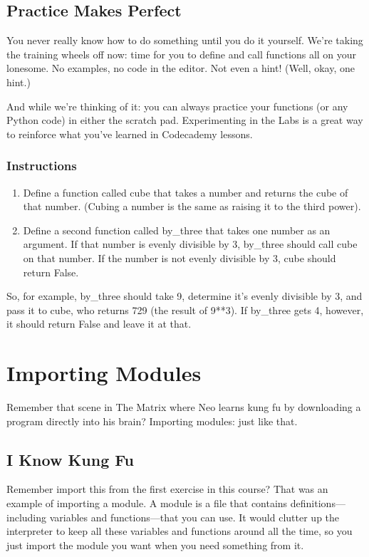 \documentclass[12pt,a4paper,final,twoside,onecolumn,titlepage]{book}
\begin{document}
\subsection{Practice Makes Perfect}

You never really know how to do something until you do it yourself. We're taking the training wheels off now: time for you to define and call functions all on your lonesome. No examples, no code in the editor. Not even a hint! (Well, okay, one hint.)

And while we're thinking of it: you can always practice your functions (or any Python code) in either the scratch pad. Experimenting in the Labs is a great way to reinforce what you've learned in Codecademy lessons.
\subsubsection{Instructions}
\begin{enumerate}
\item    Define a function called cube that takes a number and returns the cube of that number. (Cubing a number is the same as raising it to the third power).

\item    Define a second function called by\_three that takes one number as an argument. If that number is evenly divisible by 3, by\_three should call cube on that number. If the number is not evenly divisible by 3, cube should return False.
\end{enumerate}
So, for example, by\_three should take 9, determine it's evenly divisible by 3, and pass it to cube, who returns 729 (the result of 9**3). If by\_three gets 4, however, it should return False and leave it at that.

    
\section{Importing Modules}
Remember that scene in The Matrix where Neo learns kung fu by downloading a program directly into his brain? Importing modules: just like that.

\subsection{I Know Kung Fu}

Remember import this from the first exercise in this course? That was an example of importing a module. A module is a file that contains definitions—including variables and functions—that you can use. It would clutter up the interpreter to keep all these variables and functions around all the time, so you just import the module you want when you need something from it.
\end{document}
